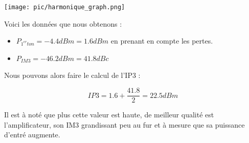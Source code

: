 \documentclass[a4paper,12pt]{report}            %
\begin{document}
\begin{center}\texttt{[image: pic/harmonique\_graph.png]}\\ \end{center}

Voici les données que nous obtenons :
\begin{itemize}
    \item $P_{1^{er}ton} = -4.4dBm = 1.6dBm$ en prenant en compte les pertes.
    \item $P_{IM3} = -46.2dBm = 41.8dBc$
\end{itemize}

Nous pouvons alors faire le calcul de l'IP3 : 

$$IP3 = 1.6 + \frac{41.8}{2} = 22.5dBm $$

Il est à noté que plus cette valeur est haute, de meilleur qualité est l'amplificateur, son IM3
grandissant peu au fur et à mesure que sa puissance d'entré augmente.
\end{document}
